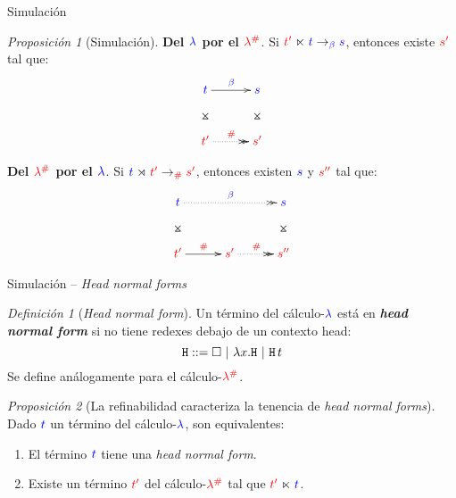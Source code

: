 \documentclass{beamer}
\theoremstyle{remark}
\newtheorem{defes}{Definición}
\newtheorem{proes}{Proposición}
\newcommand{\cLam}[1]{{\color{darkBlue} #1}}
\newcommand{\cDist}[1]{{\color{red} #1}}
\newcommand{\clambdadist}{\cDist{\lambdadist}}
\newcommand{\clambda}{\cLam{\lambda}}
\begin{document}
\begin{frame}{Simulación}
\begin{proes}[Simulación]
\textbf{Del $\clambda$ por el $\clambdadist$}.
Si $\cDist{\tm'} \refines \cLam{\tm} \to_{\cLam{\beta}} \cLam{\tmtwo}$,
entonces existe $\cDist{\tmtwo'}$ tal que:
\[
\xymatrix@=1cm{
 \cLam{\tm} \ar@{}[d]|*=0[@]{\rtimes} \ar[r]^{\cLam{\beta}} & \cLam{\tmtwo} \ar@{}[d]|*=0[@]{\rtimes} \\
 \cDist{\tm'} \ar@{.>>}[r]^{\cDist{\dist}} & \cDist{\tmtwo'} \\
}
\]

\textbf{Del $\clambdadist$ por el $\clambda$}.
Si $\cLam{\tm} \refinedby \cDist{\tm'} \to_{\cDist{\dist}} \cDist{\tmtwo'}$,
entonces existen $\cLam{\tmtwo}$ y $\cDist{\tmtwo''}$ tal que:
\[
\xymatrix@=1cm{
 \cLam{\tm} \ar@{}[d]|*=0[@]{\rtimes} \ar@{.>>}[rr]^{\cLam{\beta}} & & \cLam{\tmtwo} \ar@{}[d]|*=0[@]{\rtimes} \\
 \cDist{\tm'} \ar[r]^{\cDist{\dist}} & \cDist{\tmtwo'} \ar@{.>>}[r]^{\cDist{\dist}} & \cDist{\tmtwo''} \\
}
\]
\end{proes}
\end{frame}

\begin{frame}{Simulación -- \emph{Head normal forms}}
\begin{defes}[\emph{Head normal form}]
  Un término del cálculo-$\clambda$ está en \textbf{\emph{head normal form}} si no tiene redexes debajo de un contexto head:
\[ \mathtt{H} ::= \Box \ | \ \lambda x. \mathtt{H} \ | \ \mathtt{H}\, t \]
Se define análogamente para el cálculo-$\clambdadist$.
\end{defes}

\begin{proes}[{\footnotesize La refinabilidad caracteriza la tenencia de \emph{head normal forms}}]
  Dado $\cLam{t}$ un término del cálculo-$\clambda$, son equivalentes:
\begin{enumerate}
\item El término $\cLam{t}$ tiene una \emph{head normal form}.
\item Existe un término $\cDist{t'}$ del cálculo-$\clambdadist$ tal que $\cDist{t'} \refines \cLam{t}$.
\end{enumerate}
\end{proes}
\end{frame}
\end{document}
